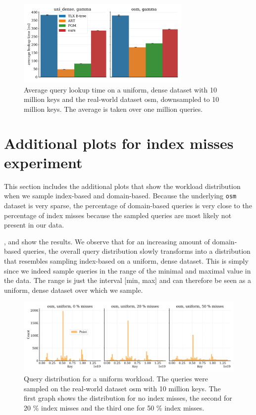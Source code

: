 \begin{figure}[ht]
    \centering
    \includegraphics[width=0.75\textwidth]{figures/app_exp2_poc_times.pdf}
    \caption[uniform and osm lookup performance after gamma sampling]{Average query lookup time on a uniform, dense dataset with 10 million keys and the real-world dataset osm, downsampled to 10 million keys. The average is taken over one million queries.}
    \label{fig:app_exp2_poc_times}
\end{figure}


\section{Additional plots for index misses experiment}\label{app:misses}
This section includes the additional plots that show the workload distribution when we sample index-based and domain-based. Because the underlying \verb|osm| dataset is very sparse, the percentage of domain-based queries is very close to the percentage of index misses because the sampled queries are most likely not present in our data. \par

,  and  show the results. We observe that for an increasing amount of domain-based queries, the overall query distribution slowly transforms into a distribution that resembles sampling index-based on a uniform, dense dataset. This is simply since we indeed sample queries in the range of the minimal and maximal value in the data. The range is just the interval [min, max] and can therefore be seen as a uniform, dense dataset over which we sample.

\vfill
\begin{figure}[hb]
    \centering
    \includegraphics[width=\textwidth]{figures/app_exp4_uni_query_dist.pdf}
    \caption[osm query distribution after uniform sampling with index misses]{Query distribution for a uniform workload. The queries were sampled on the real-world dataset osm with 10 million keys. The first graph shows the distribution for no index misses, the second for 20 \% index misses and the third one for 50 \% index misses.}
    \label{fig:app_exp4_uni_query_dist}
\end{figure}
\vfill


